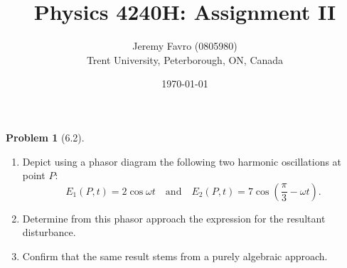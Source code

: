 \documentclass[10pt]{article}
\title{Physics 4240H: Assignment II}
\author{Jeremy Favro (0805980) \\ Trent University, Peterborough, ON, Canada}
\date{\today}
\theoremstyle{definition}
\newtheorem{problem}{Problem}
\begin{document}
\maketitle

\begin{problem}[6.2]~
\begin{enumerate}[label=(\alph*)]
  \item Depict using a phasor diagram the following two harmonic oscillations at point $P$:
        $$E_1(P,t)=2\cos\omega t\quad\text{and}\quad E_2(P,t)=7\cos(\frac{\pi}{3}-\omega t).$$
  \item Determine from this phasor approach the expression for the resultant disturbance.
  \item Confirm that the same result stems from a purely algebraic approach.
\end{enumerate}
\end{problem}
\end{document}
